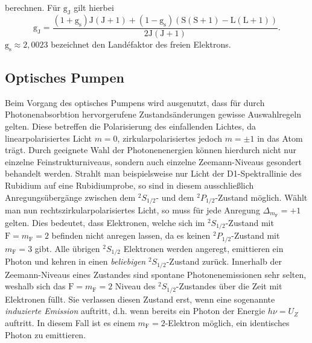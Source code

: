 berechnen.
Für $\text{g}_\text{J}$ gilt hierbei
\begin{equation}
  \text{g}_\text{J} = \frac{(1+\text{g}_\text{s})\text{J}\left(\text{J}+1\right)+(1-\text{g}_\text{s})\left(\text{S}\left(\text{S}+1\right)-\text{L}\left(\text{L}+1\right)\right)}{2\text{J}\left(\text{J}+1\right)}.
  \label{eqn:gj}
\end{equation}
$\text{g}_\text{s}\approx 2,0023$ bezeichnet den Landéfaktor des freien Elektrons.

\subsection{Optisches Pumpen}
Beim Vorgang des optisches Pumpens wird ausgenutzt, dass für durch Photonenabsorbtion hervorgerufene Zustandsänderungen gewisse Auswahlregeln gelten.
Diese betreffen die Polarisierung des einfallenden Lichtes, da linearpolarisiertes Licht $m=0$, zirkularpolarisiertes jedoch $m=\pm1$ in das Atom trägt. Durch geeignete Wahl der Photonenenergien können hierdurch nicht nur einzelne Feinstrukturniveaus, sondern auch einzelne Zeemann-Niveaus gesondert behandelt werden.
Strahlt man beispielsweise nur Licht der D1-Spektrallinie des Rubidium auf eine Rubidiumprobe, so sind in diesem ausschließlich Anregungsübergänge zwischen dem $^2{S}_{1/2}$- und dem $^2{P}_{1/2}$-Zustand möglich. Wählt man nun rechtszirkularpolarisiertes Licht, so muss für jede Anregung $\Delta_{m_{\text{F}}}=+1$ gelten. Dies bedeutet, dass Elektronen, welche sich im $^2{S}_{1/2}$-Zustand mit $\text{F}=m_{\text{F}}=2$ befinden nicht anregen lassen, da es keinen $^2{P}_{1/2}$-Zustand mit $m_{\text{F}}=3$ gibt. Alle übrigen $^2{S}_{1/2}$ Elektronen werden angeregt, emittieren ein Photon und kehren in einen \textit{beliebigen} $^2{S}_{1/2}$-Zustand zurück. Innerhalb der Zeemann-Niveaus eines Zustandes sind spontane Photonenemissionen sehr selten, weshalb sich das $\text{F}=m_{\text{F}}=2$ Niveau des $^2{S}_{1/2}$-Zustandes über die Zeit mit Elektronen füllt.
Sie verlassen diesen Zustand erst, wenn eine sogenannte \textit{induzierte Emission} auftritt, d.h. wenn bereits ein Photon der Energie $h\nu = U_{Z}$ auftritt. In diesem Fall ist es einem $m_{\text{F}}=2$-Elektron möglich, ein identisches Photon zu emittieren.
